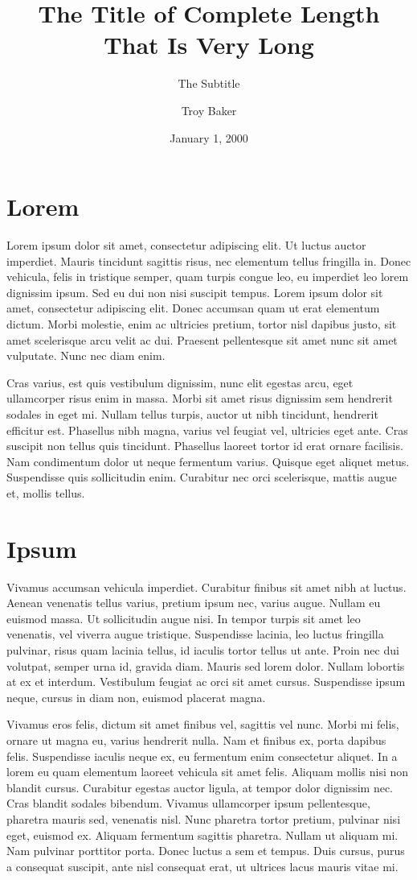 \documentclass{myCompactDoc}
\title[The Short Title]{The Title of Complete Length That Is Very Long}
\subtitle{The Subtitle} %
\author{Troy Baker}
\date{January 1, 2000}
\begin{document}
\makeTitle


\section{Lorem}
Lorem ipsum dolor sit amet, consectetur adipiscing elit. Ut luctus auctor imperdiet. Mauris tincidunt sagittis risus, nec elementum tellus fringilla in. Donec vehicula, felis in tristique semper, quam turpis congue leo, eu imperdiet leo lorem dignissim ipsum. Sed eu dui non nisi suscipit tempus. Lorem ipsum dolor sit amet, consectetur adipiscing elit. Donec accumsan quam ut erat elementum dictum. Morbi molestie, enim ac ultricies pretium, tortor nisl dapibus justo, sit amet scelerisque arcu velit ac dui. Praesent pellentesque sit amet nunc sit amet vulputate. Nunc nec diam enim.

Cras varius, est quis vestibulum dignissim, nunc elit egestas arcu, eget ullamcorper risus enim in massa. Morbi sit amet risus dignissim sem hendrerit sodales in eget mi. Nullam tellus turpis, auctor ut nibh tincidunt, hendrerit efficitur est. Phasellus nibh magna, varius vel feugiat vel, ultricies eget ante. Cras suscipit non tellus quis tincidunt. Phasellus laoreet tortor id erat ornare facilisis. Nam condimentum dolor ut neque fermentum varius. Quisque eget aliquet metus. Suspendisse quis sollicitudin enim. Curabitur nec orci scelerisque, mattis augue et, mollis tellus.

\section{Ipsum}
Vivamus accumsan vehicula imperdiet. Curabitur finibus sit amet nibh at luctus. Aenean venenatis tellus varius, pretium ipsum nec, varius augue. Nullam eu euismod massa. Ut sollicitudin augue nisi. In tempor turpis sit amet leo venenatis, vel viverra augue tristique. Suspendisse lacinia, leo luctus fringilla pulvinar, risus quam lacinia tellus, id iaculis tortor tellus ut ante. Proin nec dui volutpat, semper urna id, gravida diam. Mauris sed lorem dolor. Nullam lobortis at ex et interdum. Vestibulum feugiat ac orci sit amet cursus. Suspendisse ipsum neque, cursus in diam non, euismod placerat magna.

Vivamus eros felis, dictum sit amet finibus vel, sagittis vel nunc. Morbi mi felis, ornare ut magna eu, varius hendrerit nulla. Nam et finibus ex, porta dapibus felis. Suspendisse iaculis neque ex, eu fermentum enim consectetur aliquet. In a lorem eu quam elementum laoreet vehicula sit amet felis. Aliquam mollis nisi non blandit cursus. Curabitur egestas auctor ligula, at tempor dolor dignissim nec. Cras blandit sodales bibendum. Vivamus ullamcorper ipsum pellentesque, pharetra mauris sed, venenatis nisl. Nunc pharetra tortor pretium, pulvinar nisi eget, euismod ex. Aliquam fermentum sagittis pharetra. Nullam ut aliquam mi. Nam pulvinar porttitor porta. Donec luctus a sem et tempus. Duis cursus, purus a consequat suscipit, ante nisl consequat erat, ut ultrices lacus mauris vitae mi.
\end{document}
